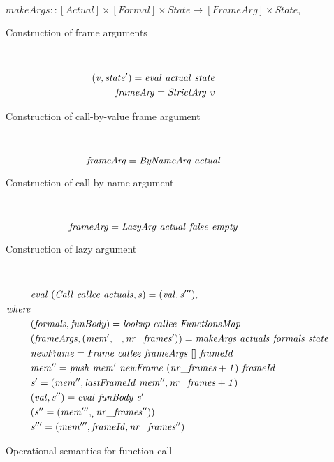 \documentclass[diploma]{softlab-thesis}
\begin{document}
\begin{figure}[htp]
  \[ \mathit{makeArgs :: [Actual] \times [Formal] \times State \rightarrow [FrameArg] \times State}, \]
\caption{Construction of frame arguments\label{fig:makeArgs}}
\end{figure} ~
\begin{figure}[htp]
  \begin{align*}
    \mathit{(v, state') = eval \hfill\ actual \hfill\ state} \\
    \mathit{frameArg = StrictArg \hfill\ v}
  \end{align*}
\caption{Construction of call-by-value frame argument\label{fig:makeCBVArg}}
\end{figure} ~
\begin{figure}[htp]
  \[ 
    \mathit{frameArg = ByNameArg \hfill\ actual} 
  \] 
\caption{Construction of call-by-name argument\label{fig:makeCBNArg}}
\end{figure} ~
\begin{figure}[htp]
  \[
    \mathit{frameArg = LazyArg \hfill\ actual \hfill\ false \hfill\ empty} 
  \]
\caption{Construction of lazy argument\label{lazyArgConstruction}}
\end{figure} ~
\begin{figure}[htp]
  \begin{align*}
    & \mathit{eval \hfill\ (Call \hfill\ callee \hfill\ actuals, s) = (val, s'''),} \\ \mathit{where} \\
    & \mathit{(formals, funBody) = lookup \hfill\ callee \hfill\ FunctionsMap} \\
    & \mathit{(frameArgs, (mem', \_, nr\_frames')) = makeArgs \hfill\ actuals \hfill\ formals  \hfill\ state} \\
    & \mathit{newFrame = Frame \hfill\ callee \hfill\ frameArgs \hfill\ [] \hfill\ frameId} \\
    & \mathit{mem'' = push \hfill\ mem' \hfill\ newFrame \hfill\ (nr\_frames + 1) \hfill\ frameId} \\
    & \mathit{s' = (mem'', lastFrameId \hfill\ mem'', nr\_frames + 1)} \\
    & \mathit{(val, s'') = eval \hfill\ funBody \hfill\ s'} \\
    & \mathit{(s'' = (mem''', _, nr\_frames''))} \\
    & \mathit{s''' = (mem''', frameId, nr\_frames'')}
  \end{align*}
\caption{Operational semantics for function call\label{fig:functionCall}}
\end{figure}
\end{document}
